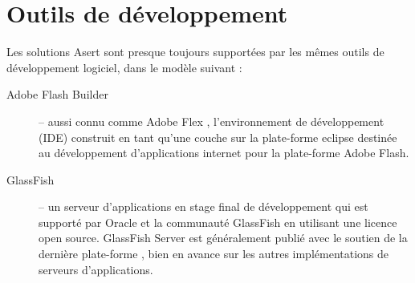 \section{Outils de développement}

Les solutions Asert sont presque toujours supportées par les mêmes outils de développement logiciel, dans le modèle suivant :
\begin{description}
\item[Adobe Flash Builder] -- aussi connu comme Adobe Flex \cite{flex}, l'environnement de développement (IDE) construit en tant qu'une couche sur la plate-forme \Gls{eclipse} destinée au développement d'applications internet pour la plate-forme Adobe Flash.
\item[GlassFish] -- un serveur d'applications en stage final de développement qui est supporté par Oracle et la communauté GlassFish en utilisant une licence open source. GlassFish Server \cite{glassfish} est généralement publié avec le soutien de la dernière plate-forme \cite{jee}, bien en avance sur les autres implémentations de serveurs d'applications.

\end{description}
